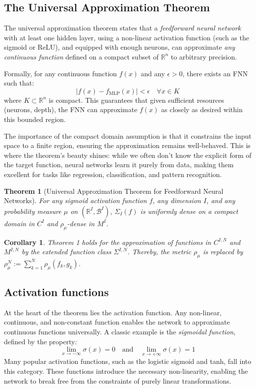 \documentclass{article}
\newtheorem{theorem}{Theorem}
\newtheorem{corollary}{Corollary}[theorem]
\theoremstyle{definition} \newtheorem{definition}{Definition}
\theoremstyle{remark} \newtheorem{remark}{Remark}
\newcounter{ct}
\begin{document}
\subsection{The Universal Approximation Theorem}
The universal approximation theorem states that a \textit{feedforward neural network} with at least one hidden layer, using a non-linear activation function (such as the sigmoid or ReLU), and equipped with enough neurons, can approximate \textit{any continuous function} defined on a compact subset of \(\mathbb{R}^n\) to arbitrary precision.

Formally, for any continuous function \(f(x)\) and any \(\epsilon > 0\), there exists an FNN such that:
\[
| f(x) - f_{\text{MLP}}(x) | < \epsilon \quad \forall x \in K
\]
where \(K \subset \mathbb{R}^n\) is compact. This guarantees that given sufficient resources (neurons, depth), the FNN can approximate \(f(x)\) as closely as desired within this bounded region.

The importance of the compact domain assumption is that it constrains the input space to a finite region, ensuring the approximation remains well-behaved.	
This is where the theorem’s beauty shines: while we often don’t know the explicit form of the target function, neural networks learn it purely from data, making them excellent for tasks like regression, classification, and pattern recognition.

 
 \begin{theorem}[Universal Approximation Theorem for Feedforward Neural Networks\citep{hornik1989multilayer,schafer2007uap}]
For any sigmoid activation function \( f \), any dimension \( I \), and any probability measure \( \mu \) on \( (\mathbb{R}^I, \mathcal{B}^I) \), \( \Sigma_I(f) \) is uniformly dense on a compact domain in \( C^I \) and \( \rho_{\mu} \)-dense in \( M^I \).
\end{theorem}

\begin{corollary}%
Theorem 1 holds for the approximation of functions in \( C^{I,N} \) and \( M^{I,N} \) by the extended function class \( \Sigma^{I,N} \). Thereby, the metric \( \rho_{\mu} \) is replaced by \( \rho_{\mu}^N := \sum_{k=1}^{N} \rho_{\mu}(f_k, g_k) \).
\end{corollary}

\subsection{Activation functions} %
At the heart of the theorem lies the activation function. Any non-linear, continuous, and non-constant function enables the network to approximate continuous functions universally.
A classic example is the \textit{sigmoidal function}, defined by the property:
\[
\lim_{x \to -\infty} \sigma(x) = 0 \quad \text{and} \quad \lim_{x \to +\infty} \sigma(x) = 1
\]
Many popular activation functions, such as the logistic sigmoid and tanh, fall into this category.
These functions introduce the necessary non-linearity, enabling the network to break free from the constraints of purely linear transformations.
\end{document}
